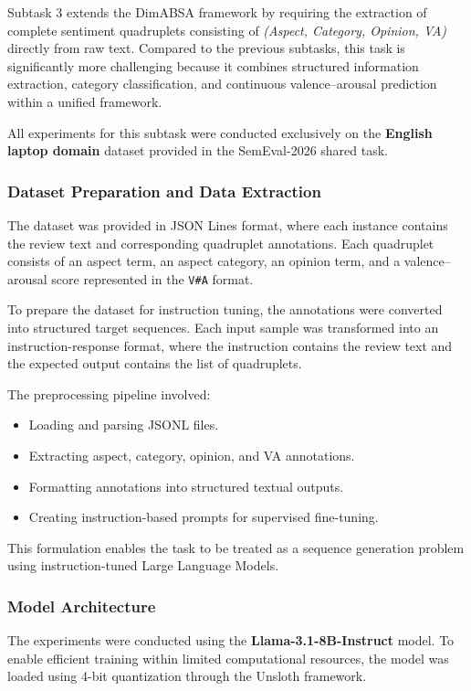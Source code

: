 \documentclass{article}
\begin{document}
Subtask 3 extends the DimABSA framework by requiring the extraction of complete sentiment quadruplets consisting of \textit{(Aspect, Category, Opinion, VA)} directly from raw text. Compared to the previous subtasks, this task is significantly more challenging because it combines structured information extraction, category classification, and continuous valence–arousal prediction within a unified framework.

All experiments for this subtask were conducted exclusively on the \textbf{English laptop domain} dataset provided in the SemEval-2026 shared task.

\subsubsection{Dataset Preparation and Data Extraction}

The dataset was provided in JSON Lines format, where each instance contains the review text and corresponding quadruplet annotations. Each quadruplet consists of an aspect term, an aspect category, an opinion term, and a valence–arousal score represented in the \texttt{V\#A} format.

To prepare the dataset for instruction tuning, the annotations were converted into structured target sequences. Each input sample was transformed into an instruction-response format, where the instruction contains the review text and the expected output contains the list of quadruplets.

The preprocessing pipeline involved:
\begin{itemize}
    \item Loading and parsing JSONL files.
    \item Extracting aspect, category, opinion, and VA annotations.
    \item Formatting annotations into structured textual outputs.
    \item Creating instruction-based prompts for supervised fine-tuning.
\end{itemize}

This formulation enables the task to be treated as a sequence generation problem using instruction-tuned Large Language Models.

\subsubsection{Model Architecture}

The experiments were conducted using the \textbf{Llama-3.1-8B-Instruct} model. To enable efficient training within limited computational resources, the model was loaded using 4-bit quantization through the Unsloth framework.
\end{document}
